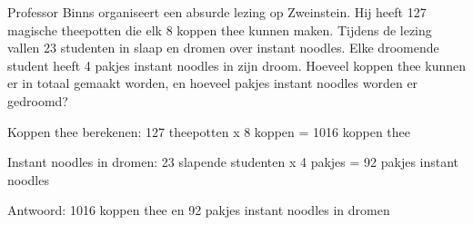 \begin{opgave}
Professor Binns organiseert een absurde lezing op Zweinstein. Hij heeft 127 
magische theepotten die elk 8 koppen thee kunnen maken. Tijdens de lezing 
vallen 23 studenten in slaap en dromen over instant noodles. Elke droomende 
student heeft 4 pakjes instant noodles in zijn droom. Hoeveel koppen thee 
kunnen er in totaal gemaakt worden, en hoeveel pakjes instant noodles worden 
er gedroomd?
\end{opgave}

\begin{oplossing}
Koppen thee berekenen:
127 theepotten x 8 koppen = 1016 koppen thee

Instant noodles in dromen:
23 slapende studenten x 4 pakjes = 92 pakjes instant noodles

Antwoord: 1016 koppen thee en 92 pakjes instant noodles in dromen
\end{oplossing}